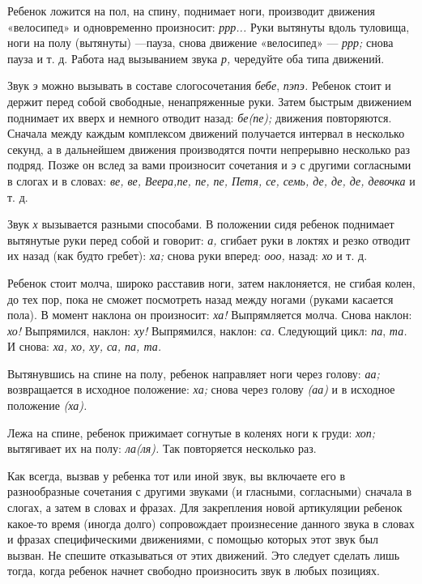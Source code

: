 \documentclass[a5paper]{book}
\renewcommand{\emph}[1]{\textit{#1}}
\begin{document}
Ребенок ложится на пол, на спину, поднимает ноги, производит движения
«велосипед» и одновременно произносит: \emph{ррр...} Руки вытянуты вдоль
туловища, ноги на полу (вытянуты) ---пауза, снова движение «велосипед»
--- \emph{ррр;} снова пауза и т. д. Работа над вызыванием звука
\emph{р,} чередуйте оба типа движений.

Звук \emph{э} можно вызывать в составе слогосочетания \emph{бебе},
\emph{пэпэ.} Ребенок стоит и держит перед собой свободные, ненапряженные
руки. Затем быстрым движением поднимает их вверх и немного отводит
назад: \emph{бе(пе);} движения повторяются. Сначала между каждым
комплексом движений получается интервал в несколько секунд, а в
дальнейшем движения производятся почти непрерывно несколько раз подряд.
Позже он вслед за вами произносит сочетания и \emph{э} с другими
согласными в слогах и в словах: \emph{ве, ве, Веера,пе, пе, пе, Петя,
се, семь, де, де, де, девочка} и т. д.

Звук \emph{х} вызывается разными способами. В положении сидя ребенок
поднимает вытянутые руки перед собой и говорит: \emph{а,} сгибает руки в
локтях и резко отводит их назад (как будто гребет): \emph{ха;} снова
руки вперед: \emph{ооо,} назад: \emph{хо} и т. д.

Ребенок стоит молча, широко расставив ноги, затем наклоняется, не сгибая
колен, до тех пор, пока не сможет посмотреть назад между ногами (руками
касается пола). В момент наклона он произносит: \emph{ха!} Выпрямляется
молча. Снова наклон: \emph{хо!} Выпрямился, наклон: \emph{ху!}
Выпрямился, наклон: \emph{са.} Следующий цикл: \emph{па}, \emph{та.} И
снова: \emph{ха, хо, ху, са, па, та.}

Вытянувшись на спине на полу, ребенок направляет ноги через голову:
\emph{аа;} возвращается в исходное положение: \emph{ха;} снова через
голову \emph{(аа)} и в исходное положение \emph{(ха).}

Лежа на спине, ребенок прижимает согнутые в коленях ноги к груди:
\emph{хоп;} вытягивает их на полу: \emph{ла(ля).} Так повторяется
несколько раз.

Как всегда, вызвав у ребенка тот или иной звук, вы включаете его в
разнообразные сочетания с другими звуками (и гласными, согласными)
сначала в слогах, а затем в словах и фразах. Для закрепления новой
артикуляции ребенок какое-то время (иногда долго) сопровождает
произнесение данного звука в словах и фразах специфическими движениями,
с помощью которых этот звук был вызван. Не спешите отказываться от этих
движений. Это следует сделать лишь тогда, когда ребенок начнет свободно
произносить звук в любых позициях.
\end{document}
